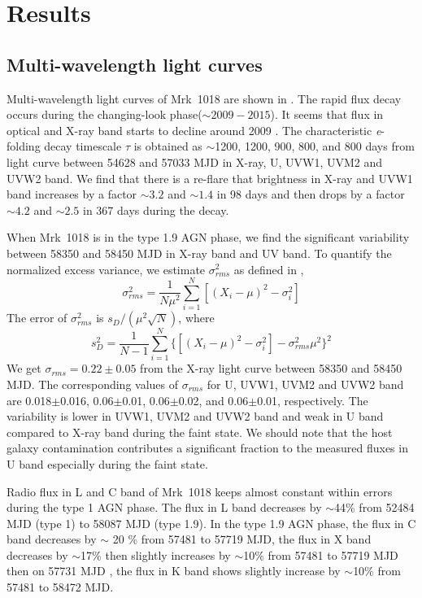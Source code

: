 \documentclass[twocolumn]{aastex63}
\begin{document}
\section{Results}
\label{sec:result}
\subsection{Multi-wavelength light curves}
\label{sec:multi-lc}

Multi-wavelength light curves of Mrk~1018 are shown in . The rapid flux decay occurs during the changing-look phase($\sim 2009-2015$). It seems that flux in optical and X-ray band starts to decline around 2009 \citep[see also the optical light curve in ][]{2016A&A...593L...8M}. The characteristic \textit{e}-folding decay timescale $\tau$ is obtained as $\sim$1200, 1200, 900, 800, and 800 days from light curve between 54628 and 57033 MJD in X-ray, U, UVW1, UVM2 and UVW2 band. We find that there is a re-flare that brightness in X-ray and UVW1 band increases by a factor $\sim3.2$ and $\sim1.4$ in 98 days and then drops by a factor $\sim4.2$ and $\sim2.5$ in 367 days during the decay. 

When Mrk~1018 is in the type 1.9 AGN phase, we find the significant variability between 58350 and 58450 MJD in X-ray band and UV band. To quantify the normalized excess variance, we estimate $\sigma^2_{rms} $ as defined in \citet{1999ApJ...524..667T},
\begin{equation}
\sigma^2_{rms}=\frac{1}{N\mu^2}\sum_{i=1}^{N}[(X_i-\mu)^2-\sigma_i^2]
\end{equation}
The error of $\sigma^2_{rms}$ is $s_D/(\mu^2\sqrt{N})$, where \begin{equation}
s_D^2=\frac{1}{N-1}\sum_{i=1}^{N}\{[(X_i-\mu)^2-\sigma_i^2]-\sigma^2_{rms}\mu^2\}^2
\end{equation}
We get $\sigma_{rms} = 0.22 \pm 0.05 $ from the X-ray light curve between 58350 and 58450 MJD. The corresponding values of $\sigma_{rms}$ for U, UVW1, UVM2 and UVW2 band are 0.018$\pm$0.016, 0.06$\pm$0.01, 0.06$\pm$0.02, and 0.06$\pm$0.01, respectively. The variability is lower in UVW1, UVM2 and UVW2 band and weak in U band compared to X-ray band during the faint state. We should note that the host galaxy contamination contributes a significant fraction to the measured fluxes in U band especially during the faint state. 


%


Radio flux in L and C band of Mrk~1018 keeps almost constant within errors during the type 1 AGN phase. The flux in L band decreases by $\sim$44\% from 52484 MJD (type 1) to 58087 MJD (type 1.9). In the type 1.9 AGN phase, the flux in C band decreases by $\sim$ 20 \% from 57481 to 57719 MJD, the flux in X band decreases by $\sim$17\% then slightly increases by $\sim$10\% from 57481 to 57719 MJD then on 57731 MJD , the flux in K band shows slightly increase by  $\sim$10\% from 57481 to 58472 MJD.
\end{document}
